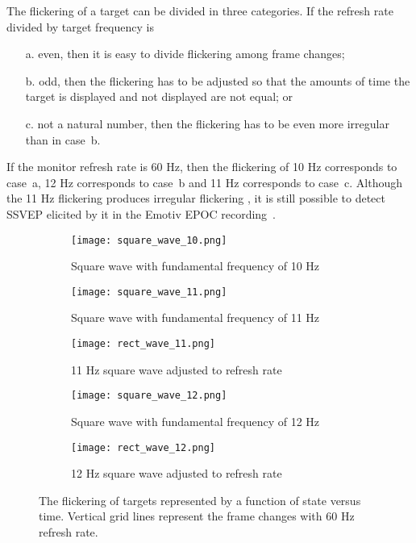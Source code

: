 The flickering of a target can be divided in three categories. If the refresh rate divided by target frequency is 
\begin{enumerate}
	\item[a.] even, then it is easy to divide flickering among frame changes;
	\item[b.] odd, then the flickering has to be adjusted so that the amounts of time the target is displayed and not displayed are not equal; or
	\item[c.] not a natural number, then the flickering has to be even more irregular than in case~b.
\end{enumerate}

If the monitor refresh rate is 60 Hz, then the flickering of 10 Hz corresponds to case~a, 12 Hz corresponds to case~b and 11 Hz corresponds to case~c. Although the 11 Hz flickering produces irregular flickering \cite{11hz}, it is still possible to detect \gls{SSVEP} elicited by it in the Emotiv EPOC recording~\cite{emotiv_11hz}.


\begin{figure}[h!]
	\centering
	\begin{subfigure}{\textwidth}
		\texttt{[image: square\_wave\_10.png]}
		\caption{Square wave with fundamental frequency of 10 Hz}
		\label{fig:square_10}
	\end{subfigure}\vspace{10pt}
	\begin{subfigure}{\textwidth}
		\texttt{[image: square\_wave\_11.png]}
		\caption{Square wave with fundamental frequency of 11 Hz}
		\label{fig:square_11}
	\end{subfigure}\vspace{10pt}
	\begin{subfigure}{\textwidth}
		\texttt{[image: rect\_wave\_11.png]}
		\caption{11 Hz square wave adjusted to refresh rate}
		\label{fig:rect_11}
	\end{subfigure}\vspace{10pt}
	\begin{subfigure}{\textwidth}
		\texttt{[image: square\_wave\_12.png]}
		\caption{Square wave with fundamental frequency of 12 Hz}
		\label{fig:square_12}
	\end{subfigure}\vspace{10pt}
	\begin{subfigure}{\textwidth}
		\texttt{[image: rect\_wave\_12.png]}
		\caption{12 Hz square wave adjusted to refresh rate}
		\label{fig:rect_12}
	\end{subfigure}
	\caption{The flickering of targets represented by a function of state versus time. Vertical grid lines represent the frame changes with 60 Hz refresh rate.}
	\label{fig:square_waves}
\end{figure}

